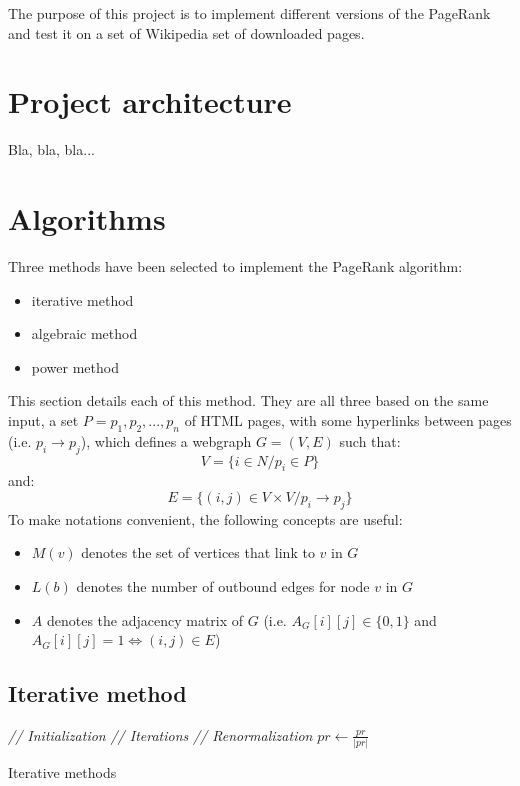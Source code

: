 \documentclass[pdftex,12pt,a4paper]{article}
\begin{document}
The purpose of this project is to implement different versions of the PageRank and test it on a set of Wikipedia set of downloaded pages.


\section{Project architecture}

Bla, bla, bla...


\section{Algorithms}

Three methods have been selected to implement the PageRank algorithm:
\begin{itemize}
\item iterative method
\item algebraic method
\item power method
\end{itemize}
This section details each of this method. They are all three based on the same input, a set $P = p_1, p_2, ..., p_n$ of HTML pages, with some hyperlinks between pages (i.e. $p_i \rightarrow p_j$), which defines a webgraph $G = \left(V, E\right)$ such that:
$$V = \{i \in N / p_i \in P\}$$
and:
$$E = \{\left(i, j\right) \in V \times V / p_i \rightarrow p_j\}$$
To make notations convenient, the following concepts are useful:
\begin{itemize}
\item $M\left(v\right)$ denotes the set of vertices that link to $v$ in $G$
\item $L\left(b\right)$ denotes the number of outbound edges for node $v$ in $G$
\item $A$ denotes the adjacency matrix of $G$ (i.e. $A_G\left[i\right]\left[j\right] \in \{0, 1\}$ and $A_G\left[i\right]\left[j\right] = 1 \Leftrightarrow \left(i, j\right) \in E$)
\end{itemize}

\subsection{Iterative method}
\IncMargin{1em}
\begin{algorithm}[H]
\BlankLine
\Indm
{}
\Indp
\BlankLine
\emph{// Initialization}\;
\emph{// Iterations}\;
\emph{// Renormalization}\;
$pr\leftarrow\frac{pr}{|pr|}$\;
\BlankLine
\caption{Iterative methods}\label{algo_iterative_method}
\end{algorithm}
\DecMargin{1em}
\end{document}
